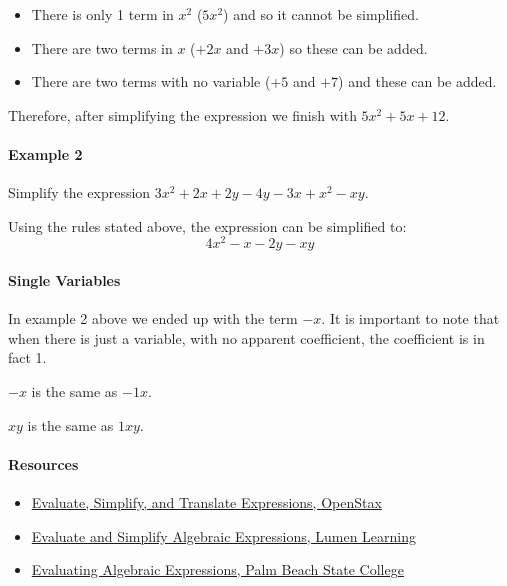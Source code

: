 \begin{itemize}
    \item There is only 1 term in $x^2$ ($5x^2$) and so it cannot be simplified.
    \item There are two terms in $x$ ($+2x$ and $+3x$) so these can be added.
    \item There are two terms with no variable ($+5$ and $+7$) and these can be added.
\end{itemize}

Therefore, after simplifying the expression we finish with $5x^2 + 5x + 12$.



\paragraph{Example 2}



Simplify the expression $3x^2 + 2x + 2y - 4y - 3x + x^2 - xy$.



Using the rules stated above, the expression can be simplified to:
$$
4x^2 - x - 2y - xy
$$
\paragraph{Single Variables}



In example 2 above we ended up with the term $-x$. It is important to note that when there is just a variable, with no apparent coefficient, the coefficient is in fact 1.



$-x$ is the same as $-1x$.



$xy$ is the same as $1xy$.





\paragraph{Resources}



\begin{itemize}
    \item \href{https://opentextbc.ca/prealgebraopenstax/chapter/evaluate-simplify-and-translate-expressions/#:\textasciitilde{}:text=To\%20evaluate\%20an\%20algebraic\%20expression,using\%20the\%20order\%20of\%20operations.}{Evaluate, Simplify, and Translate Expressions, OpenStax}
    \item \href{https://courses.lumenlearning.com/waymakercollegealgebra/chapter/evaluate-and-simplify-algebraic-expressions/}{Evaluate and Simplify Algebraic Expressions, Lumen Learning}
    \item \href{https://www.palmbeachstate.edu/prepmathlw/Documents/algebraicexpressions.pdf}{Evaluating Algebraic Expressions, Palm Beach State College}
\end{itemize}

